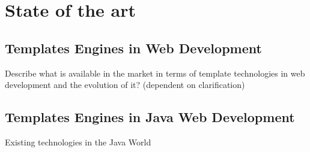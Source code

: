 \chapter{State of the art}

\section{Templates Engines in Web Development}

Describe what is available in the market in terms of template technologies in web development and the evolution of it? (dependent on clarification)

\section{Templates Engines in Java Web Development}

Existing technologies in the Java World